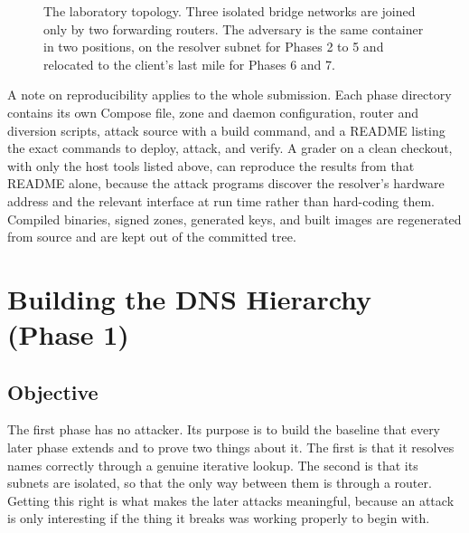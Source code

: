\documentclass[11pt]{article}
\begin{document}
\begin{figure}[H]
\caption{The laboratory topology. Three isolated bridge networks are joined only by two forwarding routers. The adversary is the same container in two positions, on the resolver subnet for Phases 2 to 5 and relocated to the client's last mile for Phases 6 and 7.}
\label{fig:topology}
\end{figure}

A note on reproducibility applies to the whole submission. Each phase directory
contains its own Compose file, zone and daemon configuration, router and diversion
scripts, attack source with a build command, and a README listing the exact
commands to deploy, attack, and verify. A grader on a clean checkout, with only
the host tools listed above, can reproduce the results from that README alone,
because the attack programs discover the resolver's hardware address and the
relevant interface at run time rather than hard-coding them. Compiled binaries,
signed zones, generated keys, and built images are regenerated from source and are
kept out of the committed tree.

\clearpage

\section{Building the DNS Hierarchy (Phase 1)}

\subsection{Objective}

The first phase has no attacker. Its purpose is to build the baseline that every
later phase extends and to prove two things about it. The first is that it resolves
names correctly through a genuine iterative lookup. The second is that its subnets
are isolated, so that the only way between them is through a router. Getting this
right is what makes the later attacks meaningful, because an attack is only
interesting if the thing it breaks was working properly to begin with.
\end{document}
